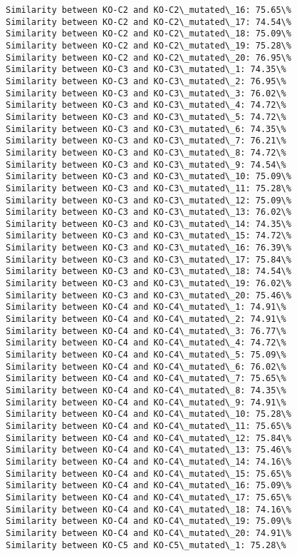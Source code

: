 \documentclass[11pt]{article}
\begin{document}
\begin{Verbatim}[commandchars=\\\{\}]
Similarity between KO-C2 and KO-C2\_mutated\_16: 75.65\%
Similarity between KO-C2 and KO-C2\_mutated\_17: 74.54\%
Similarity between KO-C2 and KO-C2\_mutated\_18: 75.09\%
Similarity between KO-C2 and KO-C2\_mutated\_19: 75.28\%
Similarity between KO-C2 and KO-C2\_mutated\_20: 76.95\%
Similarity between KO-C3 and KO-C3\_mutated\_1: 74.35\%
Similarity between KO-C3 and KO-C3\_mutated\_2: 76.95\%
Similarity between KO-C3 and KO-C3\_mutated\_3: 76.02\%
Similarity between KO-C3 and KO-C3\_mutated\_4: 74.72\%
Similarity between KO-C3 and KO-C3\_mutated\_5: 74.72\%
Similarity between KO-C3 and KO-C3\_mutated\_6: 74.35\%
Similarity between KO-C3 and KO-C3\_mutated\_7: 76.21\%
Similarity between KO-C3 and KO-C3\_mutated\_8: 74.72\%
Similarity between KO-C3 and KO-C3\_mutated\_9: 74.54\%
Similarity between KO-C3 and KO-C3\_mutated\_10: 75.09\%
Similarity between KO-C3 and KO-C3\_mutated\_11: 75.28\%
Similarity between KO-C3 and KO-C3\_mutated\_12: 75.09\%
Similarity between KO-C3 and KO-C3\_mutated\_13: 76.02\%
Similarity between KO-C3 and KO-C3\_mutated\_14: 74.35\%
Similarity between KO-C3 and KO-C3\_mutated\_15: 74.72\%
Similarity between KO-C3 and KO-C3\_mutated\_16: 76.39\%
Similarity between KO-C3 and KO-C3\_mutated\_17: 75.84\%
Similarity between KO-C3 and KO-C3\_mutated\_18: 74.54\%
Similarity between KO-C3 and KO-C3\_mutated\_19: 76.02\%
Similarity between KO-C3 and KO-C3\_mutated\_20: 75.46\%
Similarity between KO-C4 and KO-C4\_mutated\_1: 74.91\%
Similarity between KO-C4 and KO-C4\_mutated\_2: 74.91\%
Similarity between KO-C4 and KO-C4\_mutated\_3: 76.77\%
Similarity between KO-C4 and KO-C4\_mutated\_4: 74.72\%
Similarity between KO-C4 and KO-C4\_mutated\_5: 75.09\%
Similarity between KO-C4 and KO-C4\_mutated\_6: 76.02\%
Similarity between KO-C4 and KO-C4\_mutated\_7: 75.65\%
Similarity between KO-C4 and KO-C4\_mutated\_8: 74.35\%
Similarity between KO-C4 and KO-C4\_mutated\_9: 74.91\%
Similarity between KO-C4 and KO-C4\_mutated\_10: 75.28\%
Similarity between KO-C4 and KO-C4\_mutated\_11: 75.65\%
Similarity between KO-C4 and KO-C4\_mutated\_12: 75.84\%
Similarity between KO-C4 and KO-C4\_mutated\_13: 75.46\%
Similarity between KO-C4 and KO-C4\_mutated\_14: 74.16\%
Similarity between KO-C4 and KO-C4\_mutated\_15: 75.65\%
Similarity between KO-C4 and KO-C4\_mutated\_16: 75.09\%
Similarity between KO-C4 and KO-C4\_mutated\_17: 75.65\%
Similarity between KO-C4 and KO-C4\_mutated\_18: 74.16\%
Similarity between KO-C4 and KO-C4\_mutated\_19: 75.09\%
Similarity between KO-C4 and KO-C4\_mutated\_20: 74.91\%
Similarity between KO-C5 and KO-C5\_mutated\_1: 75.28\%

\end{Verbatim}
\end{document}
